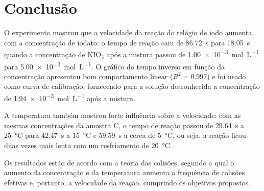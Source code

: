 \section{Conclusão}

O experimento mostrou que a velocidade da reação do relógio de iodo aumenta com a concentração de iodato: o tempo de reação caiu de \SI{86,72}{s} para \SI{18,05}{s} quando a concentração de $\mathrm{KIO_3}$ após a mistura passou de \SI{1,00e-3}{mol.L^{-1}} para \SI{5,00e-3}{mol.L^{-1}}. O gráfico do tempo inverso em função da concentração apresentou bom comportamento linear ($R^2 = \num{0,997}$) e foi usado como curva de calibração, fornecendo para a solução desconhecida a concentração de \SI{1,94e-3}{mol.L^{-1}} após a mistura.

A temperatura também mostrou forte influência sobre a velocidade: com as mesmas concentrações da amostra C, o tempo de reação passou de \SI{29,64}{s} a \SI{25}{\degreeCelsius} para \SI{42,47}{s} a \SI{15}{\degreeCelsius} e \SI{59,59}{s} a cerca de \SI{5}{\degreeCelsius}, ou seja, a reação ficou duas vezes mais lenta com um resfriamento de \SI{20}{\degreeCelsius}.

Os resultados estão de acordo com a teoria das colisões, segundo a qual o aumento da concentração e da temperatura aumenta a frequência de colisões efetivas e, portanto, a velocidade da reação, cumprindo os objetivos propostos.
